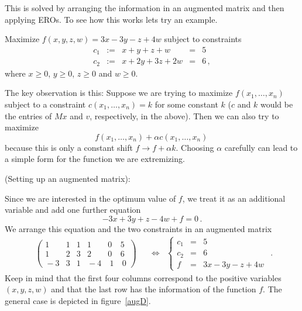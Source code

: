 This is solved by arranging the information in an augmented matrix and then applying EROs.
To see how this works lets try an example.

\begin{example}\label{stdprob}
Maximize $f(x,y,z,w)=3x-3y-z+4w$ subject to constraints
\begin{equation*}
\begin{array}{rcccl}
c_1&:=&x+y+z+w&=&5\\[2mm]
c_2&:=&x+2y+3z+2w&=&6\, ,
\end{array}
\end{equation*}
where $x\geq0$, $y\geq0$, $z\geq0$ and $w\geq 0$.
\end{example}
  The key observation is this: Suppose we are trying to maximize $f(x_1,\ldots,x_n)$ subject to 
  a constraint $c(x_1,\ldots,x_n)=k$ for some constant $k$ ($c$ and $k$ would  be the entries of 
  $Mx$ and $v$, respectively, in the above). Then we can also try to maximize
  \[
 f(x_1,\ldots,x_n)+\alpha c(x_1,\ldots,x_n)\, 
  \]
  because this is only a constant shift $f\to f+\alpha k$. Choosing $\alpha$ carefully can lead to a simple form for the function we are extremizing.



\begin{example} (Setting up an augmented matrix):

Since we are interested in the optimum value of $f$, we treat it as an additional variable and add one further equation
\[
-3x+3y+z-4w+f=0\, .
\]
We arrange this equation and the two constraints in an augmented matrix
\[
\begin{array}{ccc}
\left(\begin{array}{rrrrr|r}
1&1&1&1&0&5\\[1mm]
1&2&3&2&0&6\\\hline
\!-3&3&1&\!\!-4&\ 1&\ 0
\end{array}\right)
\quad &\Leftrightarrow &%
\left\{
\begin{array}{lcl}
c_1&=&5\\[1mm]
c_2&=&6\\[1mm]
f&=&3x-3y-z+4w
\end{array}\right.
\end{array}.
\]
Keep in mind that the first four columns correspond to the positive variables $(x,y,z,w)$ and that
the last row has the information of the function $f$. The general case is depicted in figure~\ref{augD}.
\end{example}

